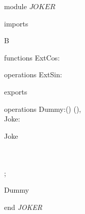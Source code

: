 {\small\sf module} $JOKER$
\begin{interface}{imports}
\begin{from}{B}
\begin{modulesignature}{functions}
ExtCos:\Real  \To \Real 
\end{modulesignature}
\begin{modulesignature}{operations}
ExtSin:\Real  \Oto \Real 
\end{modulesignature}
\end{from}
\end{interface}
\begin{interface}{exports}
\begin{modulesignature}{operations}
Dummy:() \Oto (), \\
Joke:\Real  \X \Real  \Oto \Real 
\end{modulesignature}
\end{interface}
\kDefinitions
\kOperations
\begin{op}[e]{Joke}%
\signature{\Real  \X \Real  \Oto \Real }
\If {}
\Then \\
\Else \\
\Fi;
\end{op}
\begin{op}[e]{Dummy}%
\signature{() \Oto ()}
\parms{}
\Skip 
\end{op}
{\small\sf end} {\it JOKER}

